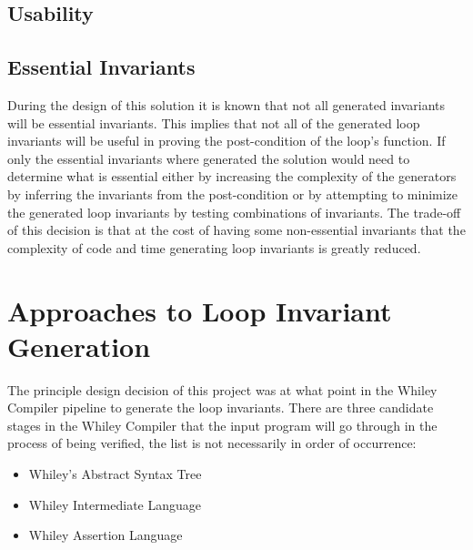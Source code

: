 \subsection{Usability}



\subsection{Essential Invariants}

During the design of this solution it is known that not all generated
invariants will be essential invariants.
This implies that not all of the generated loop invariants will be useful
in proving the post-condition of the loop's function.
If only the essential invariants where generated the solution would need
to determine what is essential either by increasing the complexity of the
generators by inferring the invariants from the post-condition or by 
attempting to minimize the generated loop invariants by testing combinations 
of invariants.
The trade-off of this decision is that at the cost of having some non-essential
invariants that the complexity of code and time generating loop invariants is
greatly reduced.

\section{Approaches to Loop Invariant Generation}

The principle design decision of this project was at
what point in the Whiley Compiler pipeline
to generate the loop invariants.
There are three candidate stages in the Whiley Compiler
that the input program will go through in the process of
being verified, the list is not necessarily in order of occurrence:

\begin{itemize}
    \item{Whiley's Abstract Syntax Tree}
    \item{Whiley Intermediate Language}
    \item{Whiley Assertion Language}
\end{itemize}

